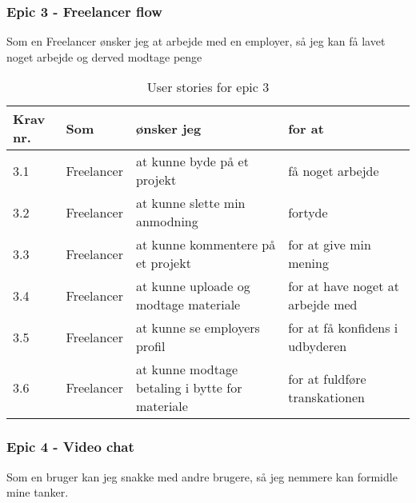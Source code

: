\subsubsection{Epic 3 - Freelancer flow}

Som en Freelancer ønsker jeg at arbejde med en employer, så jeg kan få lavet noget arbejde og derved modtage penge

\begin{table}[H]
    \centering
    \caption{User stories for epic 3}
    \label{tab:us-epic3}
    \begin{tabular}{l|l|l|l}
        \textbf{Krav nr.} & \textbf{Som} & \textbf{ønsker jeg}                             & \textbf{for at}                  \\
        \hline
        3.1               & Freelancer   & at kunne byde på et projekt                     & få noget arbejde                 \\
        \hline
        3.2               & Freelancer   & at kunne slette min anmodning                   & fortyde                          \\
        \hline
        3.3               & Freelancer   & at kunne kommentere på et projekt               & for at give min mening           \\
        \hline
        3.4               & Freelancer   & at kunne uploade og modtage materiale           & for at have noget at arbejde med \\
        \hline
        3.5               & Freelancer   & at kunne se employers profil                    & for at få konfidens i udbyderen  \\
        \hline
        3.6               & Freelancer   & at kunne modtage betaling i bytte for materiale & for at fuldføre transkationen    \\
    \end{tabular}
\end{table}

\subsubsection{Epic 4 - Video chat}

Som en bruger kan jeg snakke med andre brugere, så jeg nemmere kan formidle mine tanker.

